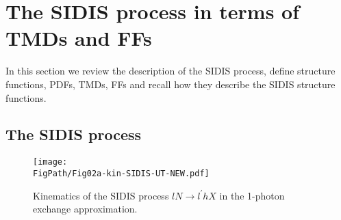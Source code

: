 \documentclass[a4paper,11pt]{article}
\newcommand*{\FigPath}{./figs}%
\begin{document}
\section{The SIDIS process in terms of TMDs and FFs}
\label{Sec-2:SIDIS+TMDs+FF}

In this section we review the description of the SIDIS process,
define structure functions, PDFs, TMDs, FFs and recall how they
describe the SIDIS structure functions.


\subsection{The SIDIS process}
\label{Sec-2.1:SIDIS+structure-functions}

\begin{wrapfigure}[9]{RD}{8cm}
\vspace{-7mm}
\centering
	\texttt{[image: \\FigPath/Fig02a-kin-SIDIS-UT-NEW.pdf]}
        \caption{\label{fig-kin-SIDIS}
    	Kinematics of the SIDIS process $lN\to l^\prime h X$
	in the 1-photon exchange approximation.}
\vspace{-5mm}
\end{wrapfigure}
\end{document}
